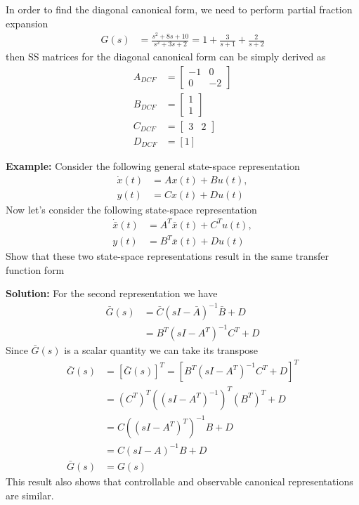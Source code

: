 \documentclass[twoside]{article}
\begin{document}
%
In order to find the diagonal canonical form, we need to perform partial fraction
expansion 
%
\begin{align*}
G(s) &= \frac{s^2 + 8 s + 10}{s^2 + 3 s + 2}
	= 1 + \frac{3}{s+1} + \frac{2}{s+2}
\end{align*}
%
then SS matrices for the diagonal canonical form can be simply derived as
%
\begin{align*}
	A_{DCF} &=  \left[ \begin{array}{cc} -1 & 0  \\  0 & -2 \end{array} \right]
		\\
	B_{DCF} &=  \left[ \begin{array}{c} 1  \\  1 \end{array} \right]
		\\
	C_{DCF} &= \left[ \begin{array}{cc} 3  &  2 \end{array} \right]
	\\
	 D_{DCF} &=  [1]
\end{align*}

\newpage

\textbf{Example:} Consider the following general
state-space representation
%
\begin{align*}
  \dot{x}(t) &= A x(t) + B u(t) , \\
  y(t) &= C x(t) + D u(t) 
\end{align*}
%
Now let's consider the following
state-space representation
%
\begin{align*}
  \dot{\bar{x}}(t) &= A^T \bar{x}(t) + C^T u(t) , \\
  y(t) &= B^T \bar{x}(t) + D u(t) 
\end{align*}
%
Show that these two state-space representations 
result in the same transfer function form

\vspace{6pt}

\textbf{Solution:} 
%
For the second representation we have 
%
\begin{align*}
\bar{G}(s) &= \bar{C} \left( s I - \bar{A} \right)^{-1} \bar{B} + D
	\\
	&= B^T \left( s I - A^T \right)^{-1} C^T + D
\end{align*}
%
Since $\bar{G}(s)$ is a scalar quantity we can take its
transpose 
%
\begin{align*}
	\bar{G}(s) &= [\bar{G}(s)]^T = 
	[ B^T \left( s I - A^T \right)^{-1} C^T + D ]^T
	\\
	&= (C^T)^T \left( \left( s I - A^T \right)^{-1} \right)^T (B^T)^T + D
	\\
	&= C \left( \left( s I - A^T \right)^T \right)^{-1} B + D
	\\
	&= C \left( s I - A \right)^{-1} B + D
	\\
	\bar{G}(s) &= G(s)
\end{align*}
%
This result also shows that controllable and observable 
canonical representations are similar. 
\end{document}
